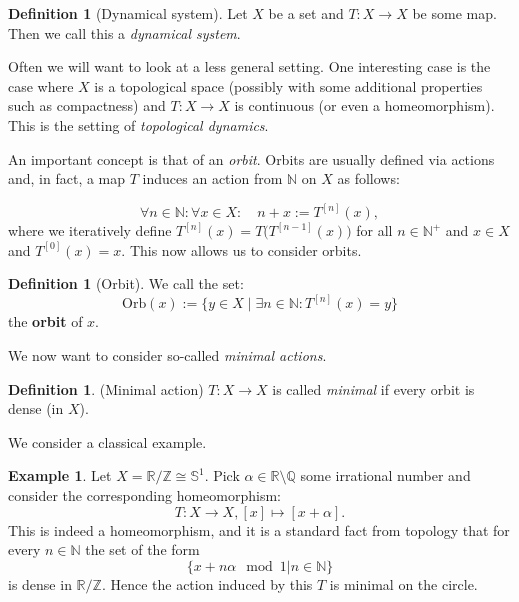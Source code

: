 \documentclass[11pt]{article}
\theoremstyle{definition}              %
\newtheorem{definition}[theorem]{Definition}
\theoremstyle{definition}              %
\newtheorem{example}[theorem]{Example}
\theoremstyle{definition}              %
\begin{document}
\begin{definition}[Dynamical system]
    Let $X$ be a set and $T: X \to X$ be some map. Then we call this a \emph{dynamical system}.
\end{definition}

Often we will want to look at a less general setting. One interesting case is the case where $X$ is a topological space (possibly with some additional properties such as compactness) and $T: X \to X$ is continuous (or even a homeomorphism). This is the setting of \emph{topological dynamics}.

An important concept is that of an \emph{orbit}. Orbits are usually defined via actions and, in fact, a map $T$ induces an action from $\mathbb{N}$ on $X$ as follows:

\begin{equation}\label{eq1}
    \forall n \in \mathbb{N}: \forall x \in X: \quad n+x := T^{[n]}(x),
\end{equation}
where we iteratively define $T^{[n]}(x)=T \big(T^{[n-1]}(x) \big)$ for all $n \in \mathbb{N}^+$ and $x \in X$ and $T^{[0]}(x)=x$. This now allows us to consider orbits.

\begin{definition}[Orbit]
    We call the set:
    \begin{equation}
        \text{Orb}(x) :=\{y \in X \mid \exists n \in \mathbb{N}: T^{[n]}(x)=y\}
    \end{equation}
    the \textbf{orbit} of $x$.
\end{definition}

We now want to consider so-called \emph{minimal actions}.

\begin{definition}(Minimal action)
    $T:X \to X$ is called \emph{minimal} if every orbit is dense (in $X$).
\end{definition}

We consider a classical example.

\begin{example}
    Let $X=\mathbb{R} / \mathbb{Z} \cong \mathbb{S}^1$. Pick $\alpha \in \mathbb{R} \setminus \mathbb{Q}$ some irrational number and consider the corresponding homeomorphism:
    \begin{equation}
        T:X \to X, [x] \mapsto [x+\alpha].
    \end{equation}
    This is indeed a homeomorphism, and it is a standard fact from topology that for every $n \in \mathbb{N}$ the set of the form
    \begin{equation}
        \{x + n \alpha \mod 1 | n \in \mathbb{N} \}
    \end{equation}
    is dense in $\mathbb{R}/\mathbb{Z}$. Hence the action induced by this $T$ is minimal on the circle.
\end{example}
\end{document}

